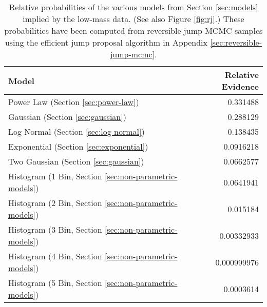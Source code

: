 \documentclass[preprint]{aastex}
\begin{document}
\begin{table}
  \begin{center}
    \begin{tabular}{|l|r|}
      \hline
      Model & Relative Evidence \\
      \hline \hline
      Power Law (Section \ref{sec:power-law}) & 0.331488 \\
      \hline
      Gaussian (Section \ref{sec:gaussian}) & 0.288129 \\ 
      \hline
      Log Normal (Section \ref{sec:log-normal}) & 0.138435 \\
      \hline
      Exponential (Section \ref{sec:exponential}) & 0.0916218 \\
      \hline
      Two Gaussian (Section \ref{sec:gaussian}) & 0.0662577 \\
      \hline
      Histogram (1 Bin, Section \ref{sec:non-parametric-models}) &
      0.0641941 \\
      \hline
      Histogram (2 Bin, Section \ref{sec:non-parametric-models}) &
      0.015184 \\
      \hline 
      Histogram (3 Bin, Section \ref{sec:non-parametric-models}) &
      0.00332933 \\
      \hline
      Histogram (4 Bin, Section \ref{sec:non-parametric-models}) &
      0.000999976 \\
      \hline 
        Histogram (5 Bin, Section \ref{sec:non-parametric-models}) &
      0.0003614  \\
      \hline      
    \end{tabular}
  \end{center}
  \caption{\label{tab:rj} Relative probabilities of the various models
    from Section \ref{sec:models} implied by the low-mass data.  (See also Figure \ref{fig:rj}.)  These probabilities have been 
    computed from reversible-jump
    MCMC samples using the efficient jump proposal algorithm in Appendix \ref{sec:reversible-jump-mcmc}.}
\end{table}
\end{document}
